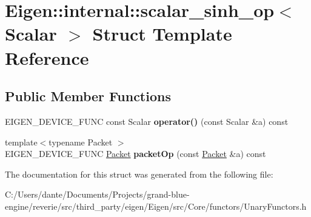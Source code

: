 \hypertarget{struct_eigen_1_1internal_1_1scalar__sinh__op}{}\section{Eigen\+::internal\+::scalar\+\_\+sinh\+\_\+op$<$ Scalar $>$ Struct Template Reference}
\label{struct_eigen_1_1internal_1_1scalar__sinh__op}
\subsection*{Public Member Functions}
\begin{DoxyCompactItemize}
\item 
\mbox{\label{struct_eigen_1_1internal_1_1scalar__sinh__op_a05557c1347e1334158d2950d0bd3f058}} 
E\+I\+G\+E\+N\+\_\+\+D\+E\+V\+I\+C\+E\+\_\+\+F\+U\+NC const Scalar {\bfseries operator()} (const Scalar \&a) const
\item 
\mbox{\label{struct_eigen_1_1internal_1_1scalar__sinh__op_a1863cdd74bb1c43cd794dc3bc5980610}} 
{\footnotesize template$<$typename Packet $>$ }\\E\+I\+G\+E\+N\+\_\+\+D\+E\+V\+I\+C\+E\+\_\+\+F\+U\+NC \mbox{\hyperlink{union_eigen_1_1internal_1_1_packet}{Packet}} {\bfseries packet\+Op} (const \mbox{\hyperlink{union_eigen_1_1internal_1_1_packet}{Packet}} \&a) const
\end{DoxyCompactItemize}


The documentation for this struct was generated from the following file\+:\begin{DoxyCompactItemize}
\item 
C\+:/\+Users/dante/\+Documents/\+Projects/grand-\/blue-\/engine/reverie/src/third\+\_\+party/eigen/\+Eigen/src/\+Core/functors/Unary\+Functors.\+h\end{DoxyCompactItemize}
